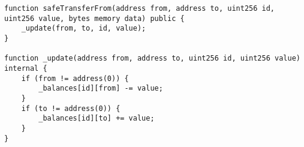 \begin{lstlisting}[label={lst:erc1155-high},captionpos=b, caption={ERC1155 Contract 0x6482e7f6: high violation severity found by AuditGPT},language=solidity]
function safeTransferFrom(address from, address to, uint256 id, uint256 value, bytes memory data) public {
    _update(from, to, id, value);
}

function _update(address from, address to, uint256 id, uint256 value) internal {
    if (from != address(0)) {
        _balances[id][from] -= value;
    }
    if (to != address(0)) {
        _balances[id][to] += value;
    }
}
\end{lstlisting}